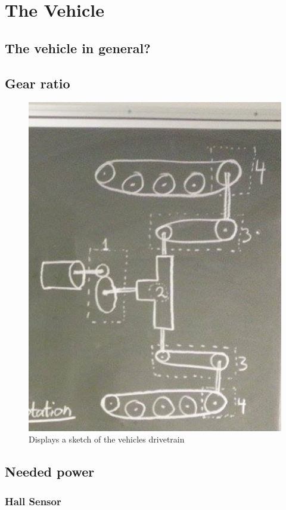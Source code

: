 \section{The Vehicle}

\subsection{The vehicle in general?}

\subsection{Gear ratio}


 \begin{figure}[H]
	\centering
	\includegraphics[scale=0.8]{figures/Drivetrain.jpg}
	\caption{Displays a sketch of the vehicles drivetrain}
	\label{fig:Drivetrain}
\end{figure}

\subsection{Needed power}

\subsubsection{Hall Sensor}


